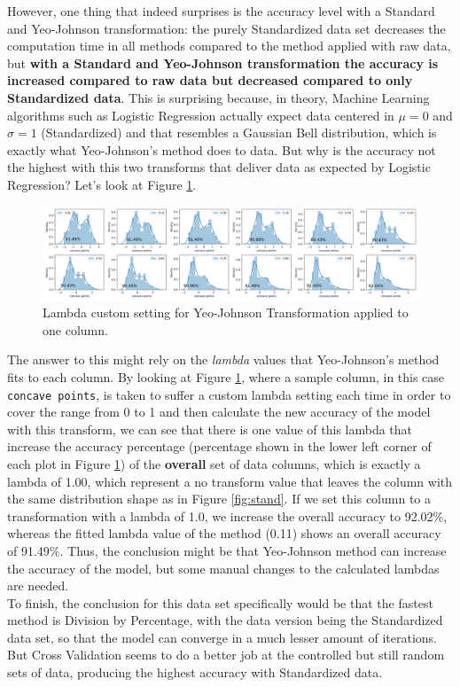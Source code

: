 \documentclass[11pt]{article}
\begin{document}
However, one thing that indeed surprises is the accuracy level with a Standard and Yeo-Johnson transformation: the purely Standardized data set decreases the computation time in all methods compared to the method applied with raw data, but \textbf{with a Standard and Yeo-Johnson transformation the accuracy is increased compared to raw data but decreased compared to only Standardized data}. This is surprising because, in theory, Machine Learning algorithms such as Logistic Regression actually expect data centered in $\mu = 0$ and $\sigma = 1$ (Standardized) and that resembles a Gaussian Bell distribution, which is exactly what Yeo-Johnson's method does to data. But why is the accuracy not the highest with this two transforms that deliver data as expected by Logistic Regression? Let's look at Figure \ref{fig:lambdas}.
\\

\begin{figure}[!ht]
\centering
    \includegraphics[width=7in]{lambdas.png}
    \caption{Lambda custom setting for Yeo-Johnson Transformation applied to one column.}
    \label{fig:lambdas}
\end{figure}

The answer to this might rely on the \textit{lambda} values that Yeo-Johnson's method fits to each column. By looking at Figure \ref{fig:lambdas}, where a sample column, in this case \verb$concave points$, is taken to suffer a custom lambda setting each time in order to cover the range from 0 to 1 and then calculate the new accuracy of the model with this transform, we can see that there is one value of this lambda that increase the accuracy percentage (percentage shown in the lower left corner of each plot in Figure \ref{fig:lambdas}) of the \textbf{overall} set of data columns, which is exactly a lambda of 1.00, which represent a no transform value that leaves the column with the same distribution shape as in Figure \ref{fig:stand}. If we set this column to a transformation with a lambda of 1.0, we increase the overall accuracy to 92.02\%, whereas the fitted lambda value of the method (0.11) shows an overall accuracy of 91.49\%. Thus, the conclusion might be that Yeo-Johnson method can increase the accuracy of the model, but some manual changes to the calculated lambdas are needed.
\\

To finish, the conclusion for this data set specifically would be that the fastest method is Division by Percentage, with the data version being the Standardized data set, so that the model can converge in a much lesser amount of iterations. But Cross Validation seems to do a better job at the controlled but still random sets of data, producing the highest accuracy with Standardized data.

\printbibliography
 
\end{document}
